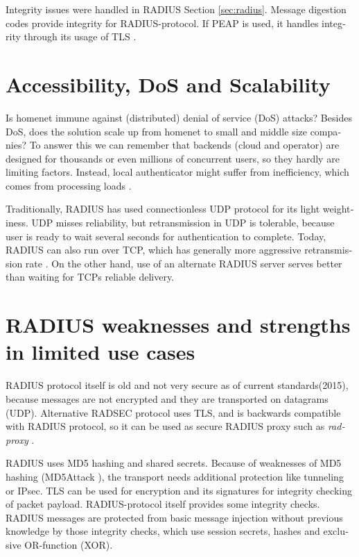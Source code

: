 \documentclass[12pt,a4paper,english]{tutthesis}
\begin{document}
\begin{otherlanguage}{english}
Integrity issues were handled in RADIUS Section \ref{sec:radius}.
Message digestion codes provide integrity for RADIUS-protocol.
If PEAP is used, it handles integrity through its usage of TLS \cite{peap}.

\section{Accessibility, DoS and Scalability}
\label{sec-6-6}
Is homenet immune against (distributed) denial of service (DoS)
attacks? Besides DoS, does the solution scale up from homenet to
small and middle size companies?
To answer this we can remember that backends (cloud and operator) are
designed for thousands or even millions of concurrent users, so 
they hardly are limiting factors. Instead, local
authenticator might suffer from inefficiency, which
comes from processing loads \cite{2009-lin-simefficiency}.


Traditionally, RADIUS has used connection\-less UDP protocol for its
light weightiness. UDP misses reliability, but retransmission in UDP is
tolerable, because user is ready to wait several seconds for
authentication to complete. Today, RADIUS can also run over TCP, which
has generally more aggressive retransmission
rate \cite[Section 2.2.1]{rfc5080}. On the other hand, use of an alternate
RADIUS server serves better than waiting for TCPs reliable delivery.



\section{RADIUS weaknesses and strengths in limited use cases}
\label{sec-6-7}


RADIUS protocol itself is old and not very secure as of current
standards(2015), because messages are not encrypted and they are
transported on datagrams (UDP). Alternative RADSEC protocol uses TLS, and 
is backwards compatible with RADIUS protocol, so it can be used
as secure RADIUS proxy such as \emph{radproxy} \cite{uninett-radproxy}.

RADIUS uses MD5 hashing and shared secrets. Because of weaknesses of
MD5 hashing (MD5Attack \cite{rfc5176}), the transport needs additional
protection like tunneling or IPsec. TLS can be used for encryption and
its signatures for integrity checking of packet payload.
RADIUS-protocol itself provides some integrity checks.
RADIUS messages are protected from basic message injection without
previous knowledge by those integrity checks, which use session
secrets, hashes and exclusive OR-function (XOR).



\end{otherlanguage}
\end{document}
